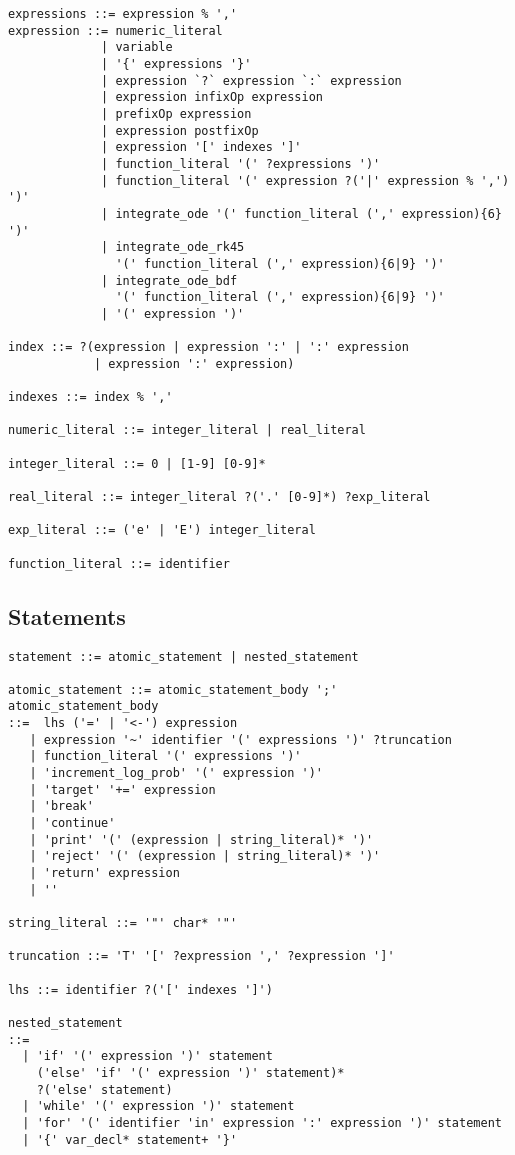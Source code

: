 {
\small
\begin{Verbatim}[fontsize=\small]
expressions ::= expression % ','
expression ::= numeric_literal
             | variable
             | '{' expressions '}'
             | expression `?` expression `:` expression
             | expression infixOp expression
             | prefixOp expression
             | expression postfixOp
             | expression '[' indexes ']'
             | function_literal '(' ?expressions ')'
             | function_literal '(' expression ?('|' expression % ',') ')'
             | integrate_ode '(' function_literal (',' expression){6} ')'
             | integrate_ode_rk45
               '(' function_literal (',' expression){6|9} ')'
             | integrate_ode_bdf
               '(' function_literal (',' expression){6|9} ')'
             | '(' expression ')'

index ::= ?(expression | expression ':' | ':' expression
            | expression ':' expression)

indexes ::= index % ','

numeric_literal ::= integer_literal | real_literal

integer_literal ::= 0 | [1-9] [0-9]*

real_literal ::= integer_literal ?('.' [0-9]*) ?exp_literal

exp_literal ::= ('e' | 'E') integer_literal

function_literal ::= identifier
\end{Verbatim}
}

\subsection{Statements}

{
\small
\begin{Verbatim}[fontsize=\small]
statement ::= atomic_statement | nested_statement

atomic_statement ::= atomic_statement_body ';'
atomic_statement_body
::=  lhs ('=' | '<-') expression
   | expression '~' identifier '(' expressions ')' ?truncation
   | function_literal '(' expressions ')'
   | 'increment_log_prob' '(' expression ')'
   | 'target' '+=' expression
   | 'break'
   | 'continue'
   | 'print' '(' (expression | string_literal)* ')'
   | 'reject' '(' (expression | string_literal)* ')'
   | 'return' expression
   | ''

string_literal ::= '"' char* '"'

truncation ::= 'T' '[' ?expression ',' ?expression ']'

lhs ::= identifier ?('[' indexes ']')

nested_statement
::=
  | 'if' '(' expression ')' statement
    ('else' 'if' '(' expression ')' statement)*
    ?('else' statement)
  | 'while' '(' expression ')' statement
  | 'for' '(' identifier 'in' expression ':' expression ')' statement
  | '{' var_decl* statement+ '}'
\end{Verbatim}
%
}

